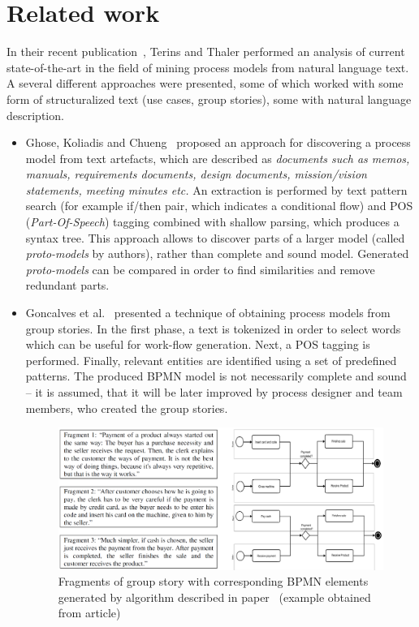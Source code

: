 \section{Related work}
\label{sec:related}
In their recent publication~\cite{process-mining-state-of-the-art}, Terins and Thaler performed an analysis of current state-of-the-art in the field of mining process models from natural language text. A several different approaches were presented, some of which worked with some form of structuralized text (use cases, group stories), some with natural language description.
\begin{itemize}
\item Ghose, Koliadis and Chueng~\cite{proces-from-text-artefacts} proposed an approach for discovering a process model from text artefacts, which are described as \emph{documents such as memos, manuals, requirements documents, design documents, mission/vision statements, meeting minutes etc.} An extraction is performed by text pattern search (for example if/then pair, which indicates a conditional flow) and POS (\emph{Part-Of-Speech}) tagging combined with shallow parsing, which produces a syntax tree. This approach allows to discover parts of a larger model (called \emph{proto-models} by authors), rather than complete and sound model. Generated \emph{proto-models} can be compared in order to find similarities and remove redundant parts.

\item Goncalves et al.~\cite{mining-group-stories} presented a technique of obtaining process models from group stories. In the first phase, a text is tokenized in order to select words which can be useful for work-flow generation. Next, a POS tagging is performed. Finally, relevant entities are identified using a set of predefined patterns.
The produced BPMN model is not necessarily complete and sound -- it is assumed, that it will be later improved by process designer and team members, who created the group stories.
\begin{figure}[h!b]
	\centering
	\includegraphics[width=\textwidth]{./images/goncalves_transform.pdf}
	\caption{Fragments of group story with corresponding BPMN elements generated by algorithm described in paper~\cite{mining-group-stories} (example obtained from article)}
	\label{fig:goncalves_example}
\end{figure}


\end{itemize}
